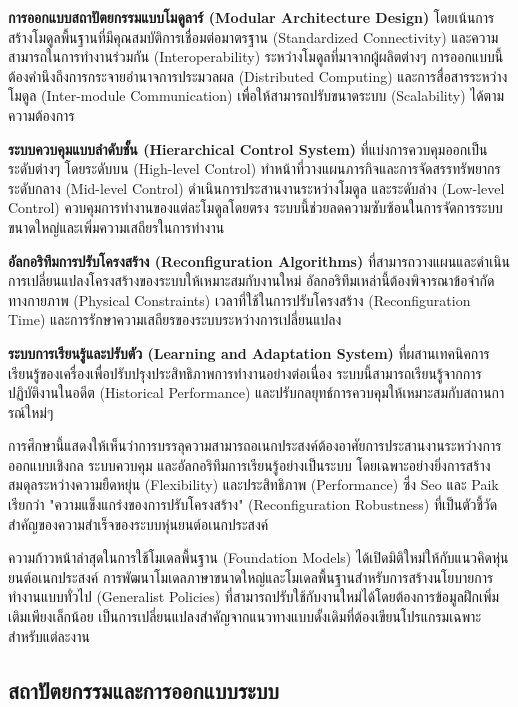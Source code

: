 \documentclass[a4paper]{article}
\begin{document}
\textbf{การออกแบบสถาปัตยกรรมแบบโมดูลาร์ (Modular Architecture Design)} โดยเน้นการสร้างโมดูลพื้นฐานที่มีคุณสมบัติการเชื่อมต่อมาตรฐาน (Standardized Connectivity) และความสามารถในการทำงานร่วมกัน (Interoperability) ระหว่างโมดูลที่มาจากผู้ผลิตต่างๆ การออกแบบนี้ต้องคำนึงถึงการกระจายอำนาจการประมวลผล (Distributed Computing) และการสื่อสารระหว่างโมดูล (Inter-module Communication) เพื่อให้สามารถปรับขนาดระบบ (Scalability) ได้ตามความต้องการ

\textbf{ระบบควบคุมแบบลำดับชั้น (Hierarchical Control System)} ที่แบ่งการควบคุมออกเป็นระดับต่างๆ โดยระดับบน (High-level Control) ทำหน้าที่วางแผนภารกิจและการจัดสรรทรัพยากร ระดับกลาง (Mid-level Control) ดำเนินการประสานงานระหว่างโมดูล และระดับล่าง (Low-level Control) ควบคุมการทำงานของแต่ละโมดูลโดยตรง ระบบนี้ช่วยลดความซับซ้อนในการจัดการระบบขนาดใหญ่และเพิ่มความเสถียรในการทำงาน

\textbf{อัลกอริทึมการปรับโครงสร้าง (Reconfiguration Algorithms)} ที่สามารถวางแผนและดำเนินการเปลี่ยนแปลงโครงสร้างของระบบให้เหมาะสมกับงานใหม่ อัลกอริทึมเหล่านี้ต้องพิจารณาข้อจำกัดทางกายภาพ (Physical Constraints) เวลาที่ใช้ในการปรับโครงสร้าง (Reconfiguration Time) และการรักษาความเสถียรของระบบระหว่างการเปลี่ยนแปลง \parencite{bi2016survey}

\textbf{ระบบการเรียนรู้และปรับตัว (Learning and Adaptation System)} ที่ผสานเทคนิคการเรียนรู้ของเครื่องเพื่อปรับปรุงประสิทธิภาพการทำงานอย่างต่อเนื่อง ระบบนี้สามารถเรียนรู้จากการปฏิบัติงานในอดีต (Historical Performance) และปรับกลยุทธ์การควบคุมให้เหมาะสมกับสถานการณ์ใหม่ๆ \parencite{thuruthel2021survey}

การศึกษานี้แสดงให้เห็นว่าการบรรลุความสามารถอเนกประสงค์ต้องอาศัยการประสานงานระหว่างการออกแบบเชิงกล ระบบควบคุม และอัลกอริทึมการเรียนรู้อย่างเป็นระบบ โดยเฉพาะอย่างยิ่งการสร้างสมดุลระหว่างความยืดหยุ่น (Flexibility) และประสิทธิภาพ (Performance) ซึ่ง Seo และ Paik เรียกว่า "ความแข็งแกร่งของการปรับโครงสร้าง" (Reconfiguration Robustness) ที่เป็นตัวชี้วัดสำคัญของความสำเร็จของระบบหุ่นยนต์อเนกประสงค์

ความก้าวหน้าล่าสุดในการใช้โมเดลพื้นฐาน (Foundation Models) ได้เปิดมิติใหม่ให้กับแนวคิดหุ่นยนต์อเนกประสงค์ การพัฒนาโมเดลภาษาขนาดใหญ่และโมเดลพื้นฐานสำหรับการสร้างนโยบายการทำงานแบบทั่วไป (Generalist Policies) ที่สามารถปรับใช้กับงานใหม่ได้โดยต้องการข้อมูลฝึกเพิ่มเติมเพียงเล็กน้อย เป็นการเปลี่ยนแปลงสำคัญจากแนวทางแบบดั้งเดิมที่ต้องเขียนโปรแกรมเฉพาะสำหรับแต่ละงาน

\subsection{สถาปัตยกรรมและการออกแบบระบบ}
\end{document}
